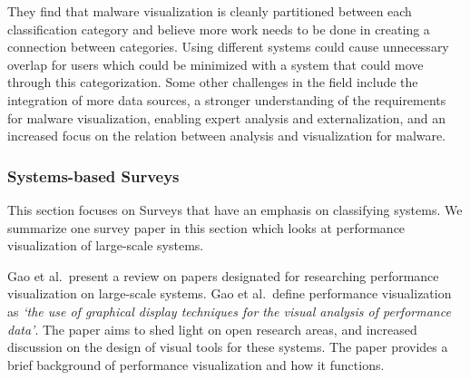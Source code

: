 
They find that malware visualization is cleanly partitioned between each classification category and believe more work needs to be done in creating a connection between  categories. Using different systems could cause unnecessary overlap for users which could be minimized with a system that could move through this categorization. Some other challenges in the field include the integration of more data sources, a stronger understanding of the requirements for malware visualization, enabling expert analysis and externalization, and an increased focus on the relation between analysis and visualization for malware.

\subsubsection{Systems-based Surveys}
This section focuses on Surveys that have an emphasis on classifying systems. We summarize one survey paper in this section which looks at performance visualization of large-scale systems.


Gao et al.\ present a review on papers designated for researching performance visualization on large-scale systems. Gao et al.\ define performance visualization as \textit{`the use of graphical display techniques for the visual analysis of performance data'}\cite{gao2011performance}. The paper aims to shed light on open research areas, and increased discussion on the design of visual tools for these systems. 
The paper provides a brief background of performance visualization and how it functions.

